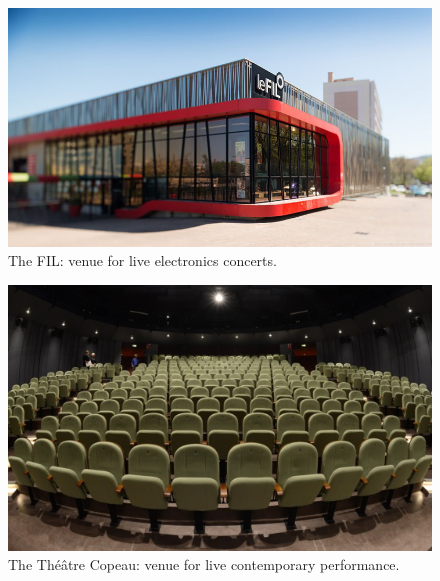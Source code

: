\documentclass[fontsize=12pt]{scrartcl} %
\numberwithin{equation}{section} %
\numberwithin{figure}{section} %
\numberwithin{table}{section} %
\begin{document}
\begin{figure}[htpb]
\begin{center}
\includegraphics[scale=0.4]{img/fil.jpg}
\caption{The FIL: venue for live electronics concerts.}
\label{fig:fil}
\end{center}
\end{figure}

\begin{figure}[htpb]
\begin{center}
\includegraphics[scale=0.5]{img/copeau.jpeg}
\caption{The Théâtre Copeau: venue for live contemporary performance.}
\label{fig:copeau}
\end{center}
\end{figure}
\end{document}
